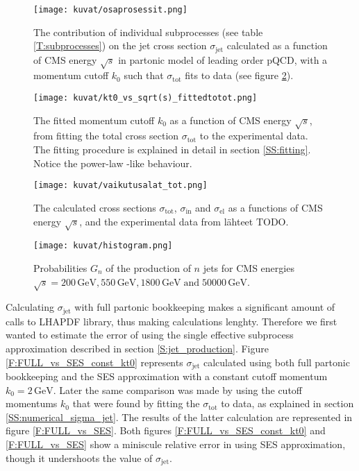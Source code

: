 \documentclass[a4paper, twoside, english, 12pt]{article}
\begin{document}
\begin{figure}[htb!]
	\centering
	\texttt{[image: kuvat/osaprosessit.png]}
	\caption{The contribution of individual subprocesses (see table \ref{T:subprocesses}) on the jet cross section $\sigma_{\text{jet}}$ calculated as a function of CMS energy $\sqrt{s}$ in partonic model of leading order pQCD, with a momentum cutoff $k_0$ such that $\sigma_{\text{tot}}$ fits to data (see figure \ref{F:kt0_fitting}).}
	\label{F:subprocess_contribution}
\end{figure}

\begin{figure}[htb!]
	\centering
	\texttt{[image: kuvat/kt0\_vs\_sqrt(s)\_fittedtotot.png]}
	\caption{The fitted momentum cutoff $k_0$ as a function of CMS energy $\sqrt{s}$, from fitting the total cross section $\sigma_{\text{tot}}$ to the experimental data. The fitting procedure is explained in detail in section \ref{SS:fitting}. Notice the power-law -like behaviour.}
	\label{F:kt0_fitting}
\end{figure}

\begin{figure}[htb!]
	\centering
	\texttt{[image: kuvat/vaikutusalat\_tot.png]}
	\caption{The calculated cross sections $\sigma_{\text{tot}}$, $\sigma_{\text{in}}$ and $\sigma_{\text{el}}$ as a functions of CMS energy $\sqrt{s}$, and the experimental data from lähteet TODO.}
	\label{F:all_sigmas}
\end{figure}

\begin{figure}[htb!]
	\centering
	\texttt{[image: kuvat/histogram.png]}
	\caption{Probabilities $G_n$ of the production of $n$ jets for CMS energies $\sqrt{s}=200\,\text{GeV}, 550\,\text{GeV}, 1800\,\text{GeV} \;\text{and}\; 50000\,\text{GeV}$.}
	\label{F:multiple_jets}
\end{figure}

Calculating $\sigma_{\text{jet}}$ with full partonic bookkeeping makes a significant amount of calls to LHAPDF library, thus making calculations lenghty. Therefore we first wanted to estimate the error of using the single effective subprocess approximation described in section \ref{S:jet_production}. Figure \ref{F:FULL_vs_SES_const_kt0} represents $\sigma_{\text{jet}}$ calculated using both full partonic bookkeeping and the SES approximation with a constant cutoff momentum $k_0=2\,\text{GeV}$. Later the same comparison was made by using the cutoff momentums $k_0$ that were found by fitting the $\sigma_{\text{tot}}$ to data, as explained in section \ref{SS:numerical_sigma_jet}. The results of the latter calculation are represented in figure \ref{F:FULL_vs_SES}. Both figures \ref{F:FULL_vs_SES_const_kt0} and \ref{F:FULL_vs_SES} show a miniscule relative error in using SES approximation, though it undershoots the value of $\sigma_{\text{jet}}$. 
\end{document}
